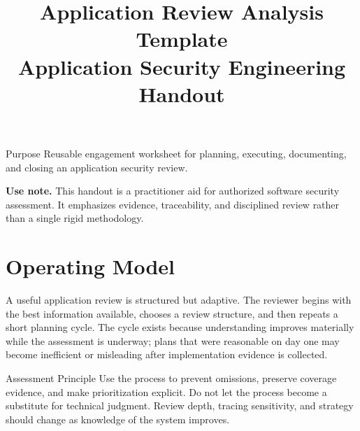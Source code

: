 \documentclass[10pt]{article}
\title{\textbf{Application Review Analysis Template}\\\large Application Security Engineering Handout}
\author{}
\date{}
\begin{document}
\maketitle
\thispagestyle{empty}
\begin{keybox}{Purpose}
Reusable engagement worksheet for planning, executing, documenting, and closing an application security review.
\end{keybox}
\vfill
\noindent\textbf{Use note.} This handout is a practitioner aid for authorized software security assessment. It emphasizes evidence, traceability, and disciplined review rather than a single rigid methodology.
\newpage
\tableofcontents
\newpage

\section{Operating Model}
A useful application review is structured but adaptive. The reviewer begins with the best information available, chooses a review structure, and then repeats a short planning cycle. The cycle exists because understanding improves materially while the assessment is underway; plans that were reasonable on day one may become inefficient or misleading after implementation evidence is collected.

\begin{center}
\end{center}

\begin{keybox}{Assessment Principle}
Use the process to prevent omissions, preserve coverage evidence, and make prioritization explicit. Do not let the process become a substitute for technical judgment. Review depth, tracing sensitivity, and strategy should change as knowledge of the system improves.
\end{keybox}
\end{document}

